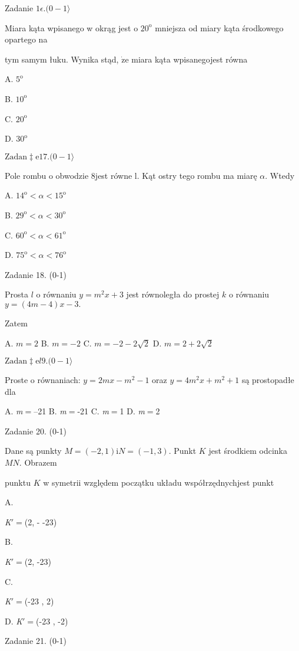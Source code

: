 \documentclass[a4paper,12pt]{article}
\begin{document}
Zadanie $1\epsilon. (0-1\rangle$

Miara kąta wpisanego w okrąg jest o $20^{\mathrm{o}}$ mniejsza od miary kąta środkowego opartego na

tym samym łuku. Wynika stąd, $\dot{\mathrm{z}}\mathrm{e}$ miara kąta wpisanegojest równa

A. $5^{\mathrm{o}}$

B. $10^{\mathrm{o}}$

C. $20^{\mathrm{o}}$

D. $30^{\mathrm{o}}$

$\mathrm{Z}\mathrm{a}\mathrm{d}\mathrm{a}\mathrm{n}\ddagger \mathrm{e}17. (0-1\rangle$

Pole rombu o obwodzie $8$jest równe l. Kąt ostry tego rombu ma miarę $\alpha$. Wtedy

A. $14^{\mathrm{o}}<\alpha<15^{\mathrm{o}}$

B. $29^{\mathrm{o}}<\alpha<30^{\mathrm{o}}$

C. $60^{\mathrm{o}}<\alpha<61^{\mathrm{o}}$

D. $75^{\mathrm{o}}<\alpha<76^{\mathrm{o}}$

Zadanie 18. (0-1)

Prosta $l$ o równaniu $y=m^{2}x+3$ jest równoległa do prostej $k$ o równaniu $y=(4m-4)x-3.$

Zatem

A. $m=2$ B. $m=-2$ C. $m=-2-2\sqrt{2}$ D. $m=2+2\sqrt{2}$

$\mathrm{Z}\mathrm{a}\mathrm{d}\mathrm{a}\mathrm{n}\ddagger \mathrm{e}l9. (0-1\rangle$

Proste o równaniach: $y=2mx-m^{2}-1$ oraz $y=4m^{2}x+m^{2}+1$ są prostopadłe dla

A. {\it m}$=$--21 B. {\it m}$=$-21 C. {\it m}$=$1 D. {\it m}$=$2

Zadanie 20. (0-1)

Dane są punkty $M=(-2,1) \mathrm{i} N=(-1,3)$. Punkt $K$ jest środkiem odcinka $MN$. Obrazem

punktu $K$ w symetrii względem początku układu współrzędnychjest punkt

A.

{\it K}$\prime =$(2, - -23)

B.

{\it K}$\prime =$(2, -23)

C.

{\it K}$\prime =$(-23 , 2)

D. {\it K}$\prime =$(-23 , -2)

Zadanie 21. (0-1)
\end{document}
